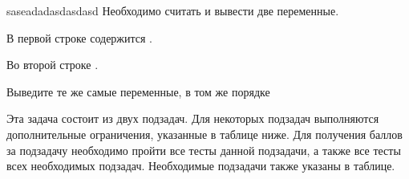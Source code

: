 \begin{problem}{\rdName}{saseadad}{asdasdasd}
Необходимо считать и вывести две переменные. 

\InputFile
В первой строке содержится \rdFirstVar.

Во второй строке \rdSecondVar.


\OutputFile
Выведите те же самые переменные, в том же порядке

\Note
Эта задача состоит из двух подзадач. Для некоторых подзадач выполняются дополнительные ограничения, указанные в таблице ниже. Для получения баллов за подзадачу необходимо пройти все тесты данной подзадачи, а также все тесты всех необходимых подзадач. Необходимые подзадачи также указаны в таблице.

\iffalse
\Examples

\begin{example}
\exmpfile{example.01}{example.01.a}%
\exmpfile{example.02}{example.02.a}%
\end{example}
\fi
\end{problem}

